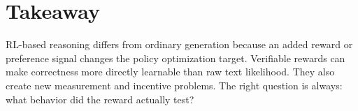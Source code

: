 \documentclass[11pt]{article}
\begin{document}
\section{Takeaway}
RL-based reasoning differs from ordinary generation because an added reward or preference signal changes the policy optimization target. Verifiable rewards can make correctness more directly learnable than raw text likelihood. They also create new measurement and incentive problems. The right question is always: what behavior did the reward actually test?

\end{document}
